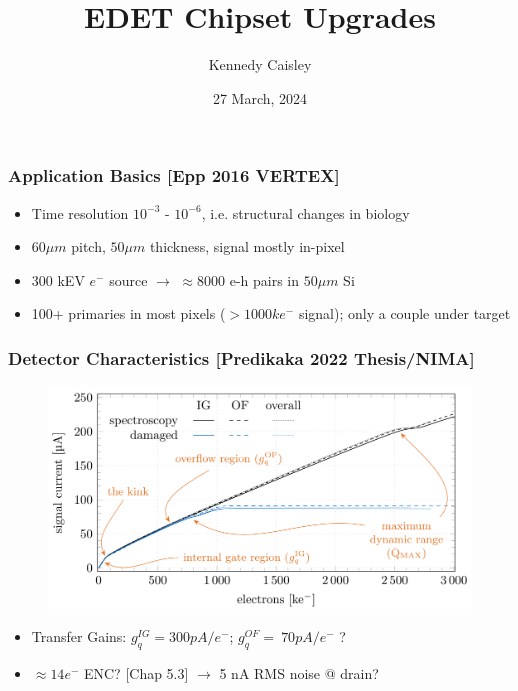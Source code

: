 \documentclass{beamer}
\title{EDET Chipset Upgrades}
\author{Kennedy Caisley}
\institute{University of Bonn}
\date{27 March, 2024}
\begin{document}
\beamertemplatenavigationsymbolsempty

\frame{\titlepage}


\begin{frame}
    \frametitle{Application Basics [Epp 2016 VERTEX]}
    \begin{itemize}
    \item Time resolution $10^{-3}$ - $10^{-6}$, i.e. structural changes in biology
    \item $60\mu m$ pitch, $50\mu m$ thickness, signal mostly in-pixel
    \item 300 kEV $e^-$ source $\rightarrow$ $\approx$8000 e-h pairs in $50\mu m$ Si
    \item 100+ primaries in most pixels ($>1000ke^-$ signal); only a couple under target

    \end{itemize}
\end{frame}

\begin{frame}
    \frametitle{Detector Characteristics [Predikaka 2022 Thesis/NIMA]}
    \begin{figure}
    \includegraphics[width=\textwidth]{response.png}
    \end{figure}
    \begin{itemize}
        \item Transfer Gains: $g_q^{IG}=300pA/e^-$;  $g_q^{OF}=~70pA/e^-$ ?
        \item $\approx14e^-$ ENC? [Chap 5.3] $\rightarrow$ 5 nA RMS noise @ drain?
    \end{itemize}
\end{frame}
\end{document}

